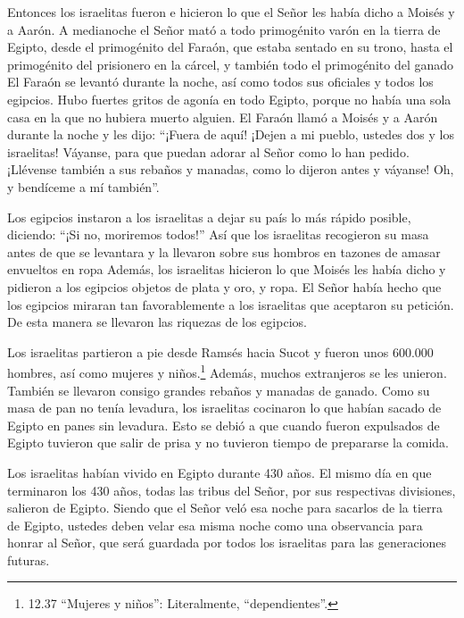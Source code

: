  Entonces los israelitas fueron e hicieron lo que el Señor
les había dicho a Moisés y a Aarón.  A medianoche el Señor
mató a todo primogénito varón en la tierra de Egipto, desde el
primogénito del Faraón, que estaba sentado en su trono, hasta el
primogénito del prisionero en la cárcel, y también todo el primogénito
del ganado  El Faraón se levantó durante la noche, así como
todos sus oficiales y todos los egipcios. Hubo fuertes gritos de agonía
en todo Egipto, porque no había una sola casa en la que no hubiera
muerto alguien.  El Faraón llamó a Moisés y a Aarón durante
la noche y les dijo: ``¡Fuera de aquí! ¡Dejen a mi pueblo, ustedes dos y
los israelitas! Váyanse, para que puedan adorar al Señor como lo han
pedido.  ¡Llévense también a sus rebaños y manadas, como lo
dijeron antes y váyanse! Oh, y bendíceme a mí también''.

 Los egipcios instaron a los israelitas a dejar su país lo
más rápido posible, diciendo: ``¡Si no, moriremos todos!'' 
Así que los israelitas recogieron su masa antes de que se levantara y la
llevaron sobre sus hombros en tazones de amasar envueltos en ropa
 Además, los israelitas hicieron lo que Moisés les había
dicho y pidieron a los egipcios objetos de plata y oro, y ropa.
 El Señor había hecho que los egipcios miraran tan
favorablemente a los israelitas que aceptaron su petición. De esta
manera se llevaron las riquezas de los egipcios.

 Los israelitas partieron a pie desde Ramsés hacia Sucot y
fueron unos 600.000 hombres, así como mujeres y niños.\footnote{12.37
  ``Mujeres y niños'': Literalmente, ``dependientes''.} 
Además, muchos extranjeros se les unieron. También se llevaron consigo
grandes rebaños y manadas de ganado.  Como su masa de pan
no tenía levadura, los israelitas cocinaron lo que habían sacado de
Egipto en panes sin levadura. Esto se debió a que cuando fueron
expulsados de Egipto tuvieron que salir de prisa y no tuvieron tiempo de
prepararse la comida.

 Los israelitas habían vivido en Egipto durante 430 años.
 El mismo día en que terminaron los 430 años, todas las
tribus del Señor, por sus respectivas divisiones, salieron de Egipto.
 Siendo que el Señor veló esa noche para sacarlos de la
tierra de Egipto, ustedes deben velar esa misma noche como una
observancia para honrar al Señor, que será guardada por todos los
israelitas para las generaciones futuras.

